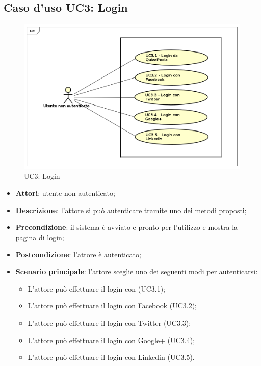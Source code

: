 \newpage
\subsection{Caso d'uso UC3: Login}
\label{UC3}
\begin{figure}
	\centering
	\includegraphics[scale=0.5]{UML/UC3.png}
	\caption{UC3: Login}
\end{figure}
\FloatBarrier
\begin{itemize}
	\item \textbf{Attori}: utente non autenticato;
	\item \textbf{Descrizione}: l'attore si può autenticare tramite uno dei metodi proposti;
	\item \textbf{Precondizione}: il sistema è avviato e pronto per l'utilizzo e mostra la pagina di login;
	\item \textbf{Postcondizione}: l'attore è autenticato;
	\item \textbf{Scenario principale}: l'attore sceglie uno dei seguenti modi per autenticarsi:
		\begin{itemize}
			\item L'attore può effettuare il login con \progetto (UC3.1);
			\item L'attore può effettuare il login con Facebook (UC3.2);
			\item L'attore può effettuare il login con Twitter (UC3.3);
			\item L'attore può effettuare il login con Google+ (UC3.4);
			\item L'attore può effettuare il login con Linkedin (UC3.5).
		\end{itemize}
\end{itemize}

